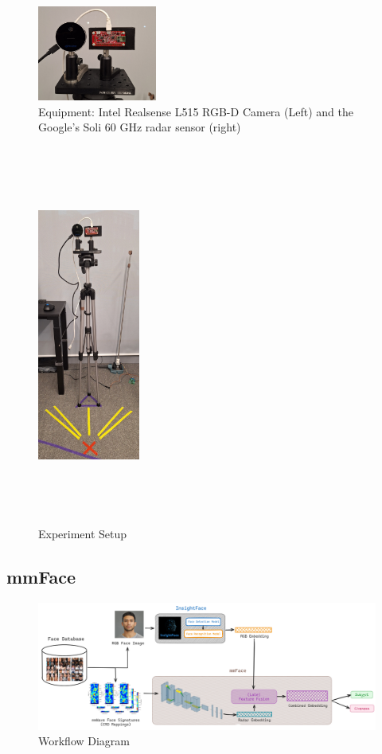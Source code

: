 \documentclass{mpaper}
\begin{document}
\begin{figure}[h!]
    \centering
    \includegraphics[width=0.35\textwidth]{diagrams/equipment.pdf}
    \vspace{0.2cm}
    \caption{Equipment: Intel Realsense L515 RGB-D Camera (Left) and the Google's Soli 60 GHz radar sensor (right)}
    \label{fig:equipment}
\end{figure}

\begin{figure}[h!]
    \centering
    \includegraphics[width=0.3\textwidth, height=12.5cm]{diagrams/experiment_setup.pdf}
    \caption{Experiment Setup}
    \label{fig:experiment_setup}
\end{figure}


\subsection{mmFace}

\begin{figure}[h!]
    \centering
    \includegraphics[width=1\textwidth]{diagrams/model_workflow.png}
    \caption{Workflow Diagram}
    \label{fig:model_workflow}
\end{figure}
\end{document}

